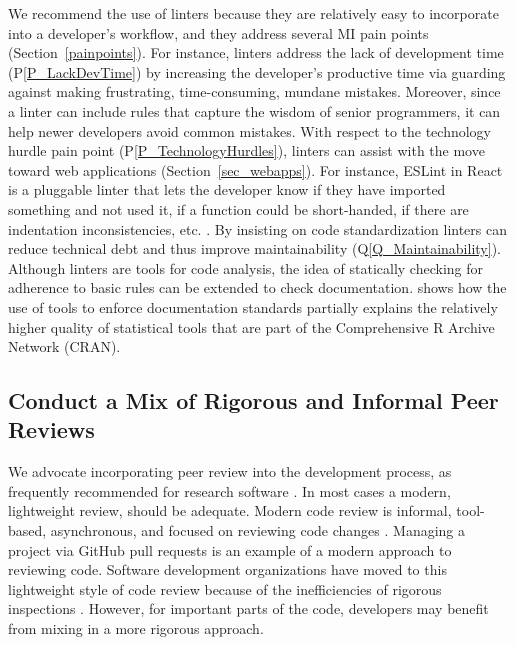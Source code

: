 \documentclass[final, 12pt, 3p, times]{elsarticle}
\newcommand{\ppref}[1]{P\ref{#1}}
\newcommand{\qref}[1]{Q\ref{#1}}
\begin{document}
We recommend the use of linters because they are relatively easy to incorporate
into a developer's workflow, and they address several MI pain points
(Section~\ref{painpoints}).  For instance, linters address the lack of
development time (\ppref{P_LackDevTime}) by increasing the developer's
productive time via guarding against making frustrating, time-consuming, mundane
mistakes.  Moreover, since a linter can include rules that capture the wisdom of
senior programmers, it can help newer developers avoid common mistakes. With
respect to the technology hurdle pain point (\ppref{P_TechnologyHurdles}),
linters can assist with the move toward web applications
(Section~\ref{sec_webapps}).  For instance, ESLint in React is a pluggable
linter that lets the developer know if they have imported something and not used
it, if a function could be short-handed, if there are indentation
inconsistencies, etc. \cite{Whitehouse2018}. By insisting on code
standardization linters can reduce technical debt and thus improve
maintainability (\qref{Q_Maintainability}). Although linters are tools for code
analysis, the idea of statically checking for adherence to basic rules can be
extended to check documentation. \cite{SmithEtAl2018_StatSoft} shows how the
use of tools to enforce documentation standards partially explains the
relatively higher quality of statistical tools that are part of the
Comprehensive R Archive Network (CRAN).

\subsection{Conduct a Mix of Rigorous and Informal Peer Reviews} \label{Sec_PeerReview}

We advocate incorporating peer review into the development process, as
frequently recommended for research software \cite{HerouxEtAl2008, Givler2020,
OrvizEtAl2017, USGS2019}. In most cases a modern, lightweight review, should be
adequate.  Modern code review is informal, tool-based, asynchronous, and focused
on reviewing code changes \cite{SadowskiEtAl2018}. Managing a project via
GitHub pull requests is an example of a modern approach to reviewing code.
Software development organizations have moved to this lightweight style of code
review because of the inefficiencies of rigorous inspections
\cite{RigbyAndBird2013}.  However, for important parts of the code, developers
may benefit from mixing in a more rigorous approach. 
\end{document}
